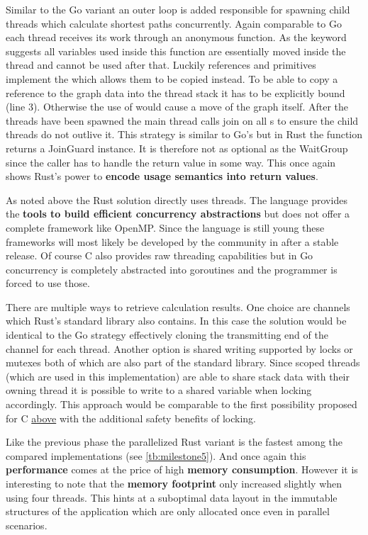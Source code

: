 Similar to the Go variant an outer loop is added responsible for spawning child threads which calculate shortest paths concurrently. Again comparable to Go each thread receives its work through an anonymous function. As the keyword  suggests all variables used inside this function are essentially moved inside the thread and cannot be used after that. Luckily references and primitives implement the  which allows them to be copied instead. To be able to copy a reference to the graph data into the thread stack it has to be explicitly bound (line 3). Otherwise the use of  would cause a move of the graph itself. After the threads have been spawned the main thread calls join on all s to ensure the child threads do not outlive it. This strategy is similar to Go's  but in Rust the  function returns a JoinGuard instance. It is therefore not as optional as the WaitGroup since the caller has to handle the return value in some way. This once again shows Rust's power to \textbf{encode usage semantics into return values}.

As noted above the Rust solution directly uses threads. The language provides the \textbf{tools to build efficient concurrency abstractions} but does not offer a complete framework like OpenMP. Since the language is still young these frameworks will most likely be developed by the community in after a stable release. Of course C also provides raw threading capabilities but in Go concurrency is completely abstracted into \glspl{goroutine} and the programmer is forced to use those.

There are multiple ways to retrieve calculation results. One choice are channels which Rust's standard library also contains. In this case the solution would be identical to the Go strategy effectively cloning the transmitting end of the channel for each thread. Another option is shared writing supported by locks or mutexes both of which are also part of the standard library. Since scoped threads (which are used in this implementation) are able to share stack data with their owning thread it is possible to write to a shared variable when locking accordingly. This approach would be comparable to the first possibility proposed for C \hyperref[subsec:Implementation::ParallelBenchmark::C]{above} with the additional safety benefits of locking.

Like the previous phase the parallelized Rust variant is the fastest among the compared implementations (see \autoref{tb:milestone5}). And once again this \textbf{performance} comes at the price of high \textbf{memory consumption}. However it is interesting to note that the \textbf{memory footprint} only increased slightly when using four threads. This hints at a suboptimal data layout in the immutable structures of the application which are only allocated once even in parallel scenarios.

